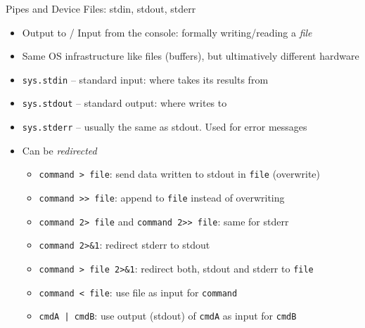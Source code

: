 \begin{frame}{Pipes and Device Files: stdin, stdout, stderr}
%
\begin{itemize}
\item Output to / Input from the console: formally writing/reading a \emph{file}
\item Same OS infrastructure like files (\eg buffers), but ultimatively different hardware
\item \texttt{sys.stdin} -- standard input: where  takes its results from
\item \texttt{sys.stdout} -- standard output: where  writes to
\item \texttt{sys.stderr} -- usually the same as stdout. Used for error messages
\item Can be \emph{redirected}
	\begin{itemize}
	\item \texttt{command > file}: send data written to stdout in \texttt{file} (overwrite)
	\item \texttt{command >{}> file}: append to \texttt{file} instead of overwriting
	\item \texttt{command 2> file} and \texttt{command 2>> file}: same for stderr
	\item \texttt{command 2>\&1}: redirect stderr to stdout
	\item \texttt{command > file 2>\&1}: redirect both, stdout and stderr to \texttt{file}
	\item \texttt{command < file}: use file as input for \texttt{command}
	\item \texttt{cmdA | cmdB}: use output (stdout) of \texttt{cmdA} as input for \texttt{cmdB}
	\end{itemize}
\end{itemize}
%
\end{frame}


